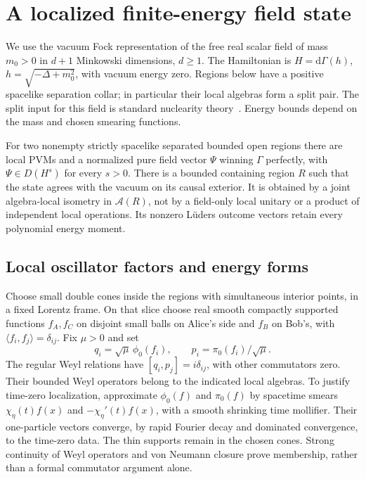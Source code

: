 \section{A localized finite-energy field state}\label{sec:field}
We use the vacuum Fock representation of the free real scalar field of mass $m_0>0$ in $d+1$ Minkowski dimensions, $d\ge1$. The Hamiltonian is $H=\mathrm d\Gamma(h)$, $h=\sqrt{-\Delta+m_0^2}$, with vacuum energy zero. Regions below have a positive spacelike separation collar; in particular their local algebras form a split pair. The split input for this field is standard nuclearity theory~\cite{BW86}. Energy bounds depend on the mass and chosen smearing functions.

\begin{theorem}\label{thm:field}
For two nonempty strictly spacelike separated bounded open regions there are local PVMs and a normalized pure field vector $\Psi$ winning $\Gamma$ perfectly, with $\Psi\in D(H^s)$ for every $s>0$. There is a bounded containing region $R$ such that the state agrees with the vacuum on its causal exterior. It is obtained by a joint algebra-local isometry in $\mathcal A(R)$, not by a field-only local unitary or a product of independent local operations. Its nonzero L\"uders outcome vectors retain every polynomial energy moment.
\end{theorem}

\subsection{Local oscillator factors and energy forms}
Choose small double cones inside the regions with simultaneous interior points, in a fixed Lorentz frame. On that slice choose real smooth compactly supported functions $f_A,f_C$ on disjoint small balls on Alice's side and $f_B$ on Bob's, with $\langle f_i,f_j\rangle=\delta_{ij}$. Fix $\mu>0$ and set
\[
 q_i=\sqrt\mu\,\phi_0(f_i),\qquad p_i=\pi_0(f_i)/\sqrt\mu.
\]
The regular Weyl relations have $[q_i,p_j]=i\delta_{ij}$, with other commutators zero. Their bounded Weyl operators belong to the indicated local algebras. To justify time-zero localization, approximate $\phi_0(f)$ and $\pi_0(f)$ by spacetime smears $\chi_\eta(t)f(x)$ and $-\chi_\eta'(t)f(x)$, with a smooth shrinking time mollifier. Their one-particle vectors converge, by rapid Fourier decay and dominated convergence, to the time-zero data. The thin supports remain in the chosen cones. Strong continuity of Weyl operators and von Neumann closure prove membership, rather than a formal commutator argument alone.

